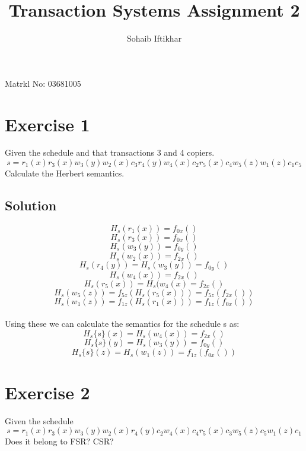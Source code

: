 \documentclass[
journal=jacsat, %
manuscript=article]{achemso}
\author{Sohaib Iftikhar}
\title[\texttt{achemso} demonstration]
{Transaction Systems Assignment 2}
\begin{document}
\begin{center}
Matrkl No: 03681005
\end{center}

\section{Exercise 1}
Given the schedule and that transactions 3 and 4 copiers. 
\[s = r_{1}(x) r_{3}(x) w_{3}(y) w_{2}(x) c_{3} r_{4}(y) w_{4}(x) c_{2} r_{5}(x) c_{4} w_{5}(z) w_{1}(z) c_{1} c_{5}\]
Calculate the Herbert semantics.
\subsection{Solution}
\[H_{s}(r_{1}(x)) = f_{0x}()\]
\[H_{s}(r_{3}(x)) = f_{0x}()\]
\[H_{s}(w_{3}(y)) = f_{0y}() \tag*{Copier}\]
\[H_{s}(w_{2}(x)) = f_{2x}() \tag*{No Input}\]
\[H_{s}(r_{4}(y)) = H_{s}(w_{3}(y)) = f_{0y}()\]
\[H_{s}(w_{4}(x)) = f_{2x}() \tag*{Copier}\]
\[H_{s}(r_{5}(x)) = H_{s}(w_{4}(x) = f_{2x}()\]
\[H_{s}(w_{5}(z)) = f_{5z}(H_{s}(r_{5}(x))) = f_{5z}(f_{2x}())\]
\[H_{s}(w_{1}(z)) = f_{1z}(H_{s}(r_{1}(x))) = f_{1z}(f_{0x}())\]
\\
Using these we can calculate the semantics for the schedule s as:
\[H_{s}\{s\}(x) = H_{s}(w_{4}(x)) = f_{2x}()\]
\[H_{s}\{s\}(y) = H_{s}(w_{3}(y)) = f_{0y}()\]
\[H_{s}\{s\}(z) = H_{s}(w_{1}(z)) = f_{1z}(f_{0x}())\]

\section{Exercise 2}
Given the schedule
\[s = r_{1}(x) r_{3}(x) w_{3}(y) w_{2}(x) r_{4}(y) c_{2} w_{4}(x) c_{4} r_{5}(x) c_{3} w_{5}(z) c_{5} w_{1}(z) c_{1}\]
Does it belong to FSR? CSR?
\end{document}
